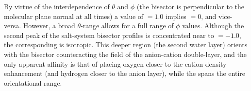 By virtue of the interdependence of $\theta$ and $\phi$ (the bisector is perpendicular to the molecular plane normal at all times) a value of \cosphi$=1.0$ implies \costheta$=0$, and vice-versa. However, a broad $\theta$-range allows for a full range of $\phi$ values. Although the second peak of the salt-system bisector profiles is concentrated near to \costheta$=-1.0$, the corresponding \phiprof is isotropic. This deeper region (the second water layer) orients with the bisector counteracting the field of the anion-cation double-layer, and the only apparent affinity is that of placing oxygen closer to the cation density enhancement (and hydrogen closer to the anion layer), while the \phiprof spans the entire orientational range.

